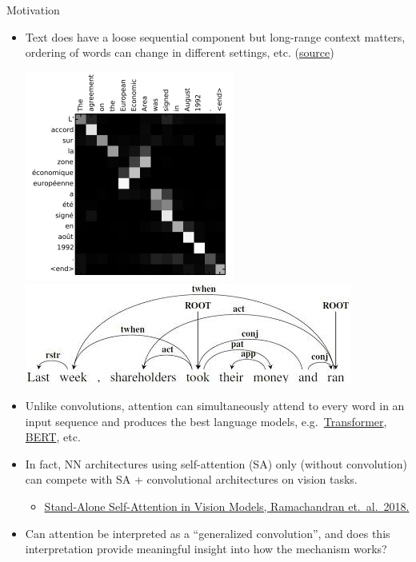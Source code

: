 \documentclass[9pt]{beamer}
\begin{document}
\begin{frame}{Motivation}
\begin{itemize}
\item Text does have a loose sequential component but long-range context matters, ordering of words can change in different settings, etc. 
(\href{https://wiki.pathmind.com/attention-mechanism-memory-network}{source})
\begin{center}
    \includegraphics[width=.25\textwidth]{presentation/images/attention_translation_grid.png}
    \qquad
    \includegraphics[width=.5\textwidth]{presentation/images/semantic_dependencies.jpg}
\end{center}

\item Unlike convolutions, attention can simultaneously attend to every word in an input sequence and produces the best language models, e.g.\ 
\href{https://papers.nips.cc/paper/2017/file/3f5ee243547dee91fbd053c1c4a845aa-Paper.pdf}{Transformer}, \href{https://arxiv.org/abs/1810.04805}{BERT}, etc.

\item In fact, NN architectures using self-attention (SA) only (without convolution) can compete with SA + convolutional architectures on vision tasks.
\begin{itemize}
    \item \href{https://arxiv.org/abs/1906.05909}{Stand-Alone Self-Attention in Vision Models, Ramachandran et.\ al.\, 2018.}
\end{itemize}

\item Can attention be interpreted as a ``generalized convolution'', and does this interpretation provide meaningful insight into how the mechanism works?
\end{itemize}
\end{frame}
\end{document}
